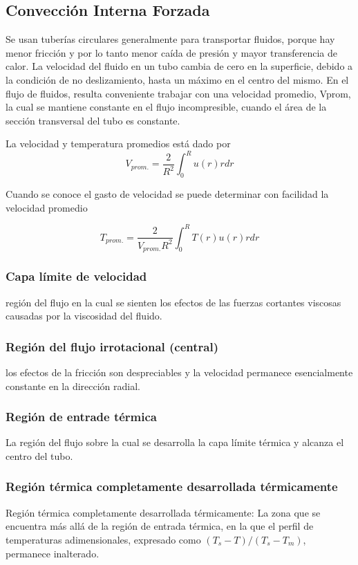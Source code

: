 \subsection{Convección Interna Forzada}
Se usan tuberías circulares generalmente para transportar fluidos, porque hay menor fricción y por lo tanto menor caída de presión y mayor transferencia de calor.
La velocidad del fluido en un tubo cambia de cero en la superficie, debido a la condición de no deslizamiento, hasta un máximo en el centro del mismo. En el flujo de fluidos, resulta conveniente trabajar con una velocidad promedio, Vprom, la cual se mantiene constante en el flujo incompresible, cuando el área de la sección transversal del tubo es constante.

La velocidad y temperatura promedios
está dado por
\begin{equation}
    V_{prom.} = \frac{2}{R^2}\int_0^R u(r)rdr
\end{equation}

Cuando se conoce el gasto  de velocidad se puede
determinar con facilidad la velocidad promedio 

\begin{equation}
    T_{prom.} = \frac{2}{V_{prom.}R^2}\int_0^R T(r)u(r)rdr
\end{equation}

\subsubsection{Capa límite de velocidad}
región del flujo en la cual se sienten los efectos de las fuerzas cortantes viscosas causadas por la viscosidad del fluido.

\subsubsection{Región del flujo irrotacional (central)}
los efectos de la fricción son despreciables y la velocidad permanece esencialmente constante en la dirección radial.

\subsubsection{Región de entrade térmica}
La región del flujo sobre la cual se desarrolla la capa límite térmica y alcanza el centro del tubo.

\subsubsection{Región térmica completamente desarrollada térmicamente}
Región térmica completamente desarrollada térmicamente: La zona que se encuentra más allá de la región de entrada térmica, en la que el perfil de temperaturas adimensionales, expresado como $(T_s - T)/(T_s - T_m)$, permanece inalterado.

